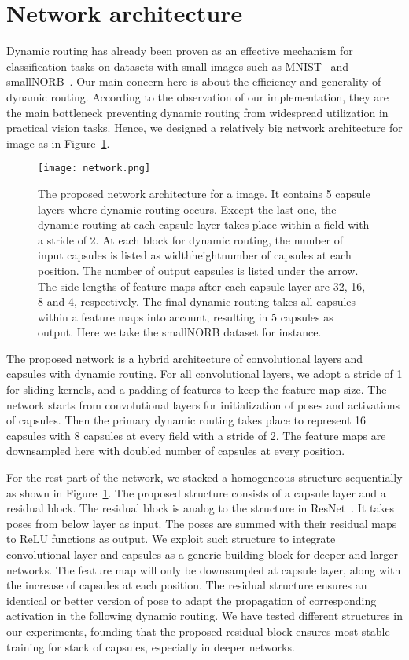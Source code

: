 \documentclass[runningheads]{llncs}
\begin{document}
\section{Network architecture}
Dynamic routing has already been proven as an effective mechanism for classification tasks on datasets with small images such as MNIST~\cite{lecun1998gradient} and smallNORB~\cite{lecun2004learning}. Our main concern here is about the efficiency and generality of dynamic routing. According to the observation of our implementation, they are the main bottleneck preventing dynamic routing from widespread utilization in practical vision tasks. Hence, we designed a relatively big network architecture for  image as in Figure~\ref{fig:network}. \begin{figure}
\centering
\texttt{[image: network.png]}
\caption{The proposed network architecture for a  image. It contains 5 capsule layers where dynamic routing occurs. Except the last one, the dynamic routing at each capsule layer takes place within a  field with a stride of 2. At each block for dynamic routing, the number of input capsules is listed as widthheightnumber of capsules at each position. The number of output capsules is listed under the arrow. The side lengths of feature maps after each capsule layer are 32, 16, 8 and 4, respectively. The final dynamic routing takes all capsules within a  feature maps into account, resulting in 5 capsules as output. Here we take the smallNORB dataset for instance.}
\label{fig:network}
\end{figure}

The proposed network is a hybrid architecture of convolutional layers and capsules with dynamic routing. For all convolutional layers, we adopt a stride of 1 for sliding kernels, and a padding of features to keep the feature map size. The network starts from convolutional layers for initialization of poses and activations of capsules. Then the primary dynamic routing takes place to represent 16 capsules with 8 capsules at every  field with a stride of 2. The feature maps are downsampled here with doubled number of capsules at every position.

For the rest part of the network, we stacked a homogeneous structure sequentially as shown in Figure~\ref{fig:network}. The proposed structure consists of a capsule layer and a residual block. The residual block is analog to the structure in ResNet~\cite{he2016deep}. It takes poses from below layer as input. The poses are summed with their residual maps to ReLU functions as output. We exploit such structure to integrate convolutional layer and capsules as a generic building block for deeper and larger networks. The feature map will only be downsampled at capsule layer, along with the increase of capsules at each position. The residual structure ensures an identical or better version of pose to adapt the propagation of corresponding activation in the following dynamic routing. We have tested different structures in our experiments, founding that the proposed residual block ensures most stable training for stack of capsules, especially in deeper networks.
\end{document}
